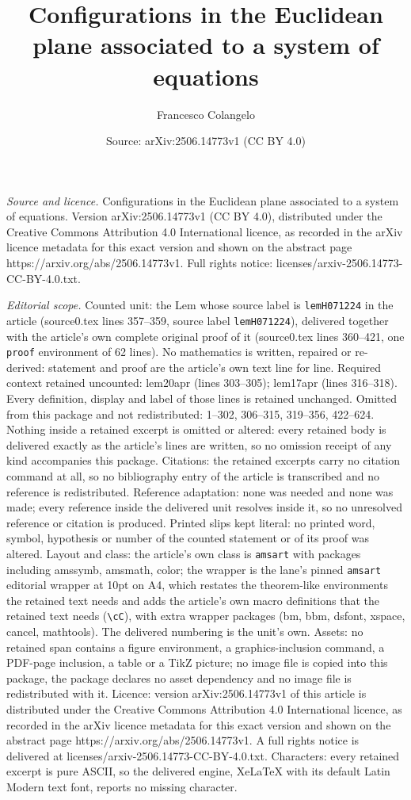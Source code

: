 \documentclass[10pt,a4paper]{amsart}
\title[Configurations in the Euclidean plane associated to a system]{Configurations in the Euclidean plane associated to a system of equations}
\author{Francesco Colangelo}
\date{Source: arXiv:2506.14773v1 (CC BY 4.0)}
\begin{document}
\maketitle

\noindent\emph{Source and licence.} Configurations in the Euclidean plane associated to a system of equations. Version arXiv:2506.14773v1 (CC BY 4.0), distributed under the Creative Commons Attribution 4.0 International licence, as recorded in the arXiv licence metadata for this exact version and shown on the abstract page https://arxiv.org/abs/2506.14773v1. Full rights notice: licenses/arxiv-2506.14773-CC-BY-4.0.txt.\par\smallskip

\noindent\textit{Editorial scope.} Counted unit: the Lem whose source label is \texttt{lemH071224} in the article (source0.tex lines 357--359, source label \texttt{lemH071224}), delivered together with the article's own complete original proof of it (source0.tex lines 360--421, one \texttt{proof} environment of 62 lines). No mathematics is written, repaired or re-derived: statement and proof are the article's own text line for line. Required context retained uncounted: lem20apr (lines 303--305); lem17apr (lines 316--318). Every definition, display and label of those lines is retained unchanged. Omitted from this package and not redistributed: 1--302, 306--315, 319--356, 422--624. Nothing inside a retained excerpt is omitted or altered: every retained body is delivered exactly as the article's lines are written, so no omission receipt of any kind accompanies this package. Citations: the retained excerpts carry no citation command at all, so no bibliography entry of the article is transcribed and no reference is redistributed. Reference adaptation: none was needed and none was made; every reference inside the delivered unit resolves inside it, so no unresolved reference or citation is produced. Printed slips kept literal: no printed word, symbol, hypothesis or number of the counted statement or of its proof was altered. Layout and class: the article's own class is \texttt{amsart} with packages including amssymb, amsmath, color; the wrapper is the lane's pinned \texttt{amsart} editorial wrapper at 10pt on A4, which restates the theorem-like environments the retained text needs and adds the article's own macro definitions that the retained text needs (\texttt{\textbackslash cC}), with extra wrapper packages (bm, bbm, dsfont, xspace, cancel, mathtools). The delivered numbering is the unit's own. Assets: no retained span contains a figure environment, a graphics-inclusion command, a PDF-page inclusion, a table or a TikZ picture; no image file is copied into this package, the package declares no asset dependency and no image file is redistributed with it. Licence: version arXiv:2506.14773v1 of this article is distributed under the Creative Commons Attribution 4.0 International licence, as recorded in the arXiv licence metadata for this exact version and shown on the abstract page https://arxiv.org/abs/2506.14773v1. A full rights notice is delivered at licenses/arxiv-2506.14773-CC-BY-4.0.txt. Characters: every retained excerpt is pure ASCII, so the delivered engine, XeLaTeX with its default Latin Modern text font, reports no missing character.
\end{document}
